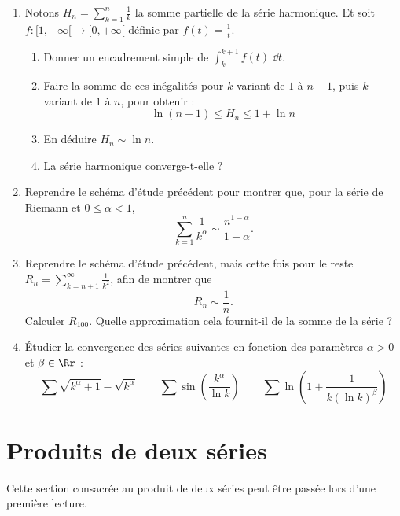 \documentclass[class=report,crop=false]{standalone}
\begin{document}
\begin{miniexercices}
\begin{enumerate}
  \item Notons $H_n = \sum_{k=1}^{n} \frac 1k$ la somme partielle de la série harmonique.
  Et soit $f : [1,+\infty[\to[0,+\infty[$ définie par $f(t)=\frac1t$.
  \begin{enumerate}
    \item Donner un encadrement simple de $\int_k^{k+1} f(t) \;\dd t$.
    \item Faire la somme de ces inégalités pour $k$ variant de $1$ à $n-1$, puis $k$ variant de $1$
  à $n$, pour obtenir :
 $$\ln(n+1) \le H_n \le1 + \ln n$$
    \item En déduire $H_n \sim \ln n$.
    \item La série harmonique converge-t-elle ?
   \end{enumerate}
  
  \item Reprendre le schéma d'étude précédent pour montrer que, pour la série de Riemann 
  et $0\le \alpha <1$,
  $$\sum_{k=1}^{n} \frac{1}{k^\alpha} \sim \frac{n^{1-\alpha}}{1-\alpha}.$$
  
  \item Reprendre le schéma d'étude précédent, mais cette fois pour le reste
  $R_n = \sum_{k=n+1}^{\infty} \frac{1}{k^2}$, afin de montrer que
  $$R_n \sim \frac{1}{n}.$$
  Calculer $R_{100}$. Quelle approximation cela fournit-il de la somme de la série ?
  
  \item \'Etudier la convergence des séries suivantes en fonction des paramètres $\alpha>0$ et $\beta \in \Rr$ :
  $$\sum \sqrt{k^\alpha+1}-\sqrt{k^\alpha} \qquad
  \sum \sin\left(\frac{k^\alpha}{\ln k}\right) \qquad
  \sum \ln \left(1+\frac{1}{k(\ln k)^\beta}\right)$$
  
  
\end{enumerate}
\end{miniexercices}




\section{Produits de deux séries}

Cette section consacrée au produit de deux séries 
peut être passée lors d'une première lecture.

\end{document}
